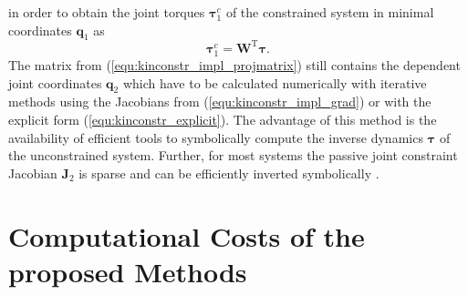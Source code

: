 \documentclass{svproc}
\newcommand{\bm}[1]{\boldsymbol{#1}}
\newcommand{\transp}[0]{{\mathrm{T}}}
\begin{document}
%
in order to obtain the joint torques $\bm{\tau}^c_1$ of the constrained system in minimal coordinates $\bm{q}_1$ as
%
\begin{equation}
\bm{\tau}^{c}_{1} = \bm{W}^\transp \bm{\tau}.
\label{equ:tau_projection}
\end{equation}
%
The matrix from (\ref{equ:kinconstr_impl_projmatrix}) still contains the dependent joint coordinates $\bm{q}_2$ which have to be calculated numerically with iterative methods using the Jacobians from (\ref{equ:kinconstr_impl_grad}) or with the explicit form (\ref{equ:kinconstr_explicit}).
The advantage of this method is the availability of efficient tools to symbolically compute the inverse dynamics $\bm{\tau}$ of the unconstrained system.
Further, for most systems the passive joint constraint Jacobian $\bm{J}_2$ is sparse and can be efficiently inverted symbolically \cite{ParkChoPlo1999}.

\section{Computational Costs of the proposed Methods}
\label{sec:simulation}
\end{document}
